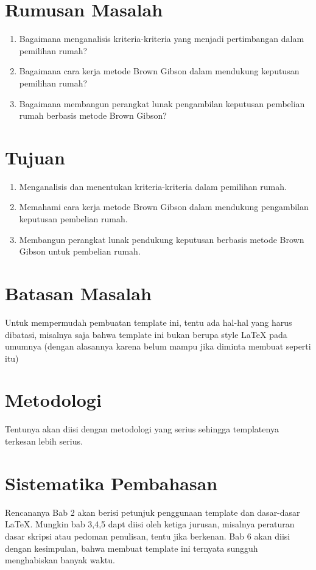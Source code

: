 \section{Rumusan Masalah}
\label{sec:rumusan}
\begin{enumerate}
	\item Bagaimana menganalisis kriteria-kriteria yang menjadi pertimbangan dalam pemilihan rumah?
	\item Bagaimana cara kerja metode Brown Gibson dalam mendukung keputusan pemilihan rumah?
	\item Bagaimana membangun perangkat lunak pengambilan keputusan pembelian rumah berbasis metode Brown Gibson?
\end{enumerate}

\section{Tujuan}
\label{sec:tujuan}
\begin{enumerate}
	\item Menganalisis dan menentukan kriteria-kriteria dalam pemilihan rumah.
	\item Memahami cara kerja metode Brown Gibson dalam mendukung pengambilan keputusan pembelian rumah.
	\item Membangun perangkat lunak pendukung keputusan berbasis metode Brown Gibson untuk pembelian rumah.
\end{enumerate}


\section{Batasan Masalah}
\label{sec:batasan}
Untuk mempermudah pembuatan template ini, tentu ada hal-hal yang harus dibatasi, misalnya saja bahwa template ini bukan berupa style \LaTeX{} pada umumnya (dengan alasannya karena belum mampu jika diminta membuat seperti itu)


\section{Metodologi}
\label{sec:metlit}
Tentunya akan diisi dengan metodologi yang serius sehingga templatenya terkesan lebih serius.


\section{Sistematika Pembahasan}
\label{sec:sispem}
Rencananya Bab 2 akan berisi petunjuk penggunaan template dan dasar-dasar \LaTeX.
Mungkin bab 3,4,5 dapt diisi oleh ketiga jurusan, misalnya peraturan dasar skripsi atau pedoman penulisan, tentu jika berkenan.
Bab 6 akan diisi dengan kesimpulan, bahwa membuat template ini ternyata sungguh menghabiskan banyak waktu.

